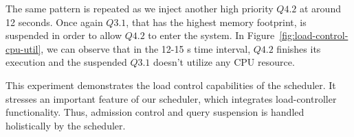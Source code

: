 The same pattern is repeated as we inject another high priority $Q4.2$ at around 12 seconds.
Once again $Q3.1$, that has the highest memory footprint, is suspended in order to allow $Q4.2$ to enter the system. 
In Figure~\ref{fig:load-control-cpu-util}, we can observe that in the 12-15 s time interval, $Q4.2$ finishes its execution and the suspended $Q3.1$ doesn't utilize any CPU resource.

This experiment demonstrates the load control capabilities of the \sys{}
scheduler. 
It stresses an important feature of our scheduler, which integrates load-controller functionality. %
Thus, admission control and query suspension is handled holistically by the scheduler. 